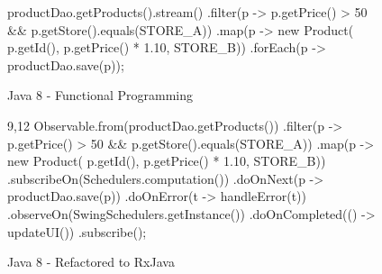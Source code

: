 \begin{figure}[h]
\begin{minipage}{0.48\textwidth}
\begin{sourcecode}
\begin{javacode}{}
productDao.getProducts().stream()
        .filter(p ->
                p.getPrice() > 50 &&
                p.getStore().equals(STORE_A))
        .map(p -> new Product(
                p.getId(),
                p.getPrice() * 1.10,
                STORE_B))
        .forEach(p -> productDao.save(p));
\end{javacode}
\caption{Java 8 - Functional Programming}
\label{code:con-java8}
\end{sourcecode}
\end{minipage}\hspace{0.7cm}
\begin{minipage}{0.48\textwidth}
\begin{sourcecode}
\begin{javacode}{9,12}
Observable.from(productDao.getProducts())
        .filter(p ->
                p.getPrice() > 50 &&
                p.getStore().equals(STORE_A))
        .map(p -> new Product(
                p.getId(),
                p.getPrice() * 1.10,
                STORE_B))
        .subscribeOn(Schedulers.computation())
        .doOnNext(p -> productDao.save(p))
        .doOnError(t -> handleError(t))
        .observeOn(SwingSchedulers.getInstance())
        .doOnCompleted(() -> updateUI())
        .subscribe();
\end{javacode}
\caption{Java 8 - Refactored to RxJava}
\label{code:con-rxjava}
\end{sourcecode}
\end{minipage}
\end{figure}